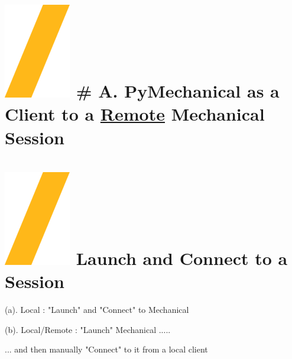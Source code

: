 \documentclass[9pt,landscape]{article}
\begin{document}
\begin{multicols}{3}
\setlength{\premulticols}{1pt}
\setlength{\postmulticols}{1pt}
\setlength{\multicolsep}{1pt}
\setlength{\columnsep}{2pt}

\vfill
\section{\includegraphics[height=\fontcharht\font`\S]{slash.png} # A. PyMechanical as a Client to a \underline{Remote} Mechanical Session}

\vspace{5mm} %

\section{\includegraphics[height=\fontcharht\font`\S]{slash.png} Launch and Connect to a Session}

(a). Local : "Launch"  and "Connect" to Mechanical


(b). Local/Remote : "Launch" Mechanical .....


... and then  manually "Connect" to it from a local client





\end{multicols}
\end{document}
